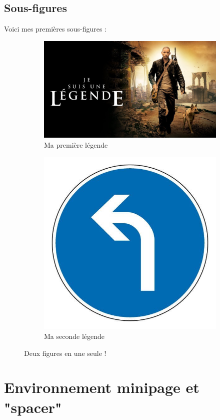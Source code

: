 \documentclass[a4paper, 13pt]{report} %
\begin{document}
		\section{Sous-figures}
			Voici mes premières sous-figures :
			\begin{figure}[h]\centering
				\hfill
				\begin{subfigure}[b]{.4\textwidth}\centering
					\includegraphics[width=\textwidth]{legende.jpg}
					\caption{Ma première légende}
				\end{subfigure}
				\hfill
				\begin{subfigure}[b]{.2\textwidth}\centering
					\includegraphics[width=\textwidth]{gauche.jpg}
					\caption{Ma seconde légende}
				\end{subfigure}
				\hfill\null
				\caption{\label{fig:premiere_subfig}Deux figures en une seule !}
			\end{figure}
		
	
	\chapter{Environnement minipage et "spacer"}
		
	
\end{document}
